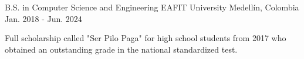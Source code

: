 

\begin{cventries}

  \cventry
    {B.S. in Computer Science and Engineering} %
    {EAFIT University} %
    {Medellín, Colombia} %
    {Jan. 2018 - Jun. 2024} %
    {
      \begin{cvitems} %
        \item {Full scholarship called "Ser Pilo Paga" for high school students from 2017 who
        obtained an outstanding grade in the national standardized test.}
      \end{cvitems}
    }

\end{cventries}
